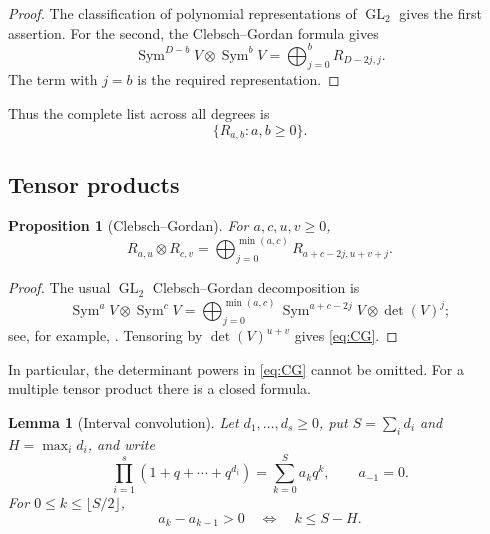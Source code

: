 \documentclass[11pt,reqno]{amsart}
\newtheorem{proposition}[theorem]{Proposition}
\newtheorem{lemma}[theorem]{Lemma}
\theoremstyle{definition}
\theoremstyle{remark}
\newcommand{\GL}{\operatorname{GL}}
\newcommand{\Sym}{\operatorname{Sym}}
\begin{document}
\begin{proof}
The classification of polynomial representations of $\GL_2$ gives the first
assertion.  For the second, the Clebsch--Gordan formula gives
\begin{equation*}
 \Sym^{D-b}V\otimes\Sym^bV
 =\bigoplus_{j=0}^{b}R_{D-2j,j}.
\end{equation*}
The term with $j=b$ is the required representation.
\end{proof}

Thus the complete list across all degrees is
\begin{equation}\label{eq:all-Rab}
 \{R_{a,b}:a,b\geq0\}.
\end{equation}

\subsection{Tensor products}

\begin{proposition}[Clebsch--Gordan]\label{prop:CG}
For $a,c,u,v\geq0$,
\begin{equation}\label{eq:CG}
 R_{a,u}\otimes R_{c,v}
 =
 \bigoplus_{j=0}^{\min(a,c)}
 R_{a+c-2j,u+v+j}.
\end{equation}
\end{proposition}

\begin{proof}
The usual $\GL_2$ Clebsch--Gordan decomposition is
\begin{equation*}
 \Sym^aV\otimes\Sym^cV
 =\bigoplus_{j=0}^{\min(a,c)}
 \Sym^{a+c-2j}V\otimes\det(V)^j;
\end{equation*}
see, for example, \cite[Section~11.2]{FultonHarris}.  Tensoring by
$\det(V)^{u+v}$ gives \eqref{eq:CG}.
\end{proof}

In particular, the determinant powers in \eqref{eq:CG} cannot be omitted.
For a multiple tensor product there is a closed formula.

\begin{lemma}[Interval convolution]\label{lem:interval-convolution}
Let $d_1,\ldots,d_s\geq0$, put $S=\sum_i d_i$ and $H=\max_i d_i$, and write
\begin{equation*}
 \prod_{i=1}^{s}(1+q+\cdots+q^{d_i})
 =\sum_{k=0}^{S}a_kq^k,\qquad a_{-1}=0.
\end{equation*}
For $0\leq k\leq\lfloor S/2\rfloor$,
\begin{equation}\label{eq:interval-convolution}
 a_k-a_{k-1}>0\quad\Longleftrightarrow\quad k\leq S-H.
\end{equation}
\end{lemma}
\end{document}
